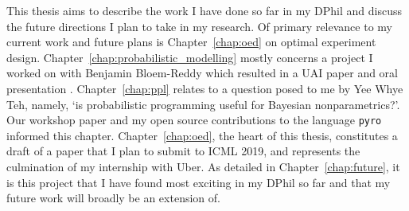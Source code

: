 This thesis aims to describe the work I have done so far in my DPhil and discuss the future directions I plan to take in my research. Of primary relevance to my current work and future plans is Chapter~\ref{chap:oed} on optimal experiment design. Chapter~\ref{chap:probabilistic_modelling} mostly concerns a project I worked on with Benjamin Bloem-Reddy which resulted in a UAI paper and oral presentation \cite{bntl}. Chapter~\ref{chap:ppl} relates to a question posed to me by Yee Whye Teh, namely, `is probabilistic programming useful for Bayesian nonparametrics?'. Our workshop paper \cite{bnpppl} and my open source contributions to the language \texttt{pyro} informed this chapter. Chapter~\ref{chap:oed}, the heart of this thesis, constitutes a draft of a paper that I plan to submit to ICML 2019, and represents the culmination of my internship with Uber. As detailed in Chapter~\ref{chap:future}, it is this project that I have found most exciting in my DPhil so far and that my future work will broadly be an extension of.